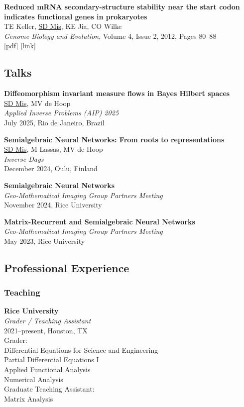 \documentclass[
  letterpaper,
  DIV=11,
  numbers=noendperiod]{scrartcl}
\begin{document}
\textbf{Reduced mRNA secondary-structure stability near the start codon
indicates functional genes in prokaryotes}\\
TE Keller, \ul{SD Mis}, KE Jia, CO Wilke\\
\emph{Genome Biology and Evolution}, Volume 4, Issue 2, 2012, Pages
80--88\\
{[}\href{https://academic.oup.com/gbe/article-pdf/4/2/80/17915831/evr129.pdf}{pdf}{]}
{[}\href{https://academic.oup.com/gbe/article/4/2/80/555289}{link}{]}

\subsection{Talks}\label{talks}

\textbf{Diffeomorphism invariant measure flows in Bayes Hilbert
spaces}\\
\ul{SD Mis}, MV de Hoop\\
\emph{Applied Inverse Problems (AIP) 2025}\\
July 2025, Rio de Janeiro, Brazil

\textbf{Semialgebraic Neural Networks: From roots to representations}\\
\ul{SD Mis}, M Lassas, MV de Hoop\\
\emph{Inverse Days}\\
December 2024, Oulu, Finland

\textbf{Semialgebraic Neural Networks}\\
\emph{Geo-Mathematical Imaging Group Partners Meeting}\\
November 2024, Rice University

\textbf{Matrix-Recurrent and Semialgebraic Neural Networks}\\
\emph{Geo-Mathematical Imaging Group Partners Meeting}\\
May 2023, Rice University

\subsection{Professional Experience}\label{professional-experience}

\subsubsection{Teaching}\label{teaching}

\textbf{Rice University}\\
\emph{Grader / Teaching Assistant}\\
2021--present, Houston, TX\\
Grader:\\
{Differential Equations for Science and Engineering}\\
{Partial Differential Equations I}\\
{Applied Functional Analysis}\\
{Numerical Analysis}\\
Graduate Teaching Assistant:\\
{Matrix Analysis}
\end{document}
